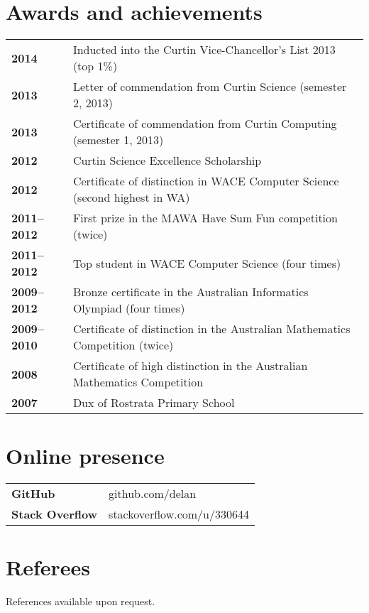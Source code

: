 \documentclass[a4paper,12pt]{article}
\begin{document}
\section*{Awards and achievements}

\begin{tabular}{p{4cm}p{14cm}}
	\textbf{2014} &
		Inducted into the Curtin Vice-Chancellor's List 2013
		(top 1\%) \\
	\textbf{2013} &
		Letter of commendation from Curtin Science
		(semester 2, 2013) \\
	\textbf{2013} &
		Certificate of commendation from Curtin Computing
		(semester 1, 2013) \\
	\textbf{2012} &
		Curtin Science Excellence Scholarship \\
	\textbf{2012} &
		Certificate of distinction in WACE Computer Science
		(second highest in WA) \\
	\textbf{2011--2012} &
		First prize in the MAWA Have Sum Fun competition (twice) \\
	\textbf{2011--2012} &
		Top student in WACE Computer Science (four times) \\
	\textbf{2009--2012} &
		Bronze certificate in the Australian Informatics Olympiad
		(four times) \\
	\textbf{2009--2010} &
		Certificate of distinction in the Australian Mathematics
		Competition (twice) \\
	\textbf{2008} &
		Certificate of high distinction in the Australian Mathematics
		Competition \\
	\textbf{2007} &
		Dux of Rostrata Primary School \\
\end{tabular}

\vspace{0.5cm}

\begin{minipage}[t]{9cm}
\section*{Online presence}
\begin{tabular}{ll}
	\textbf{GitHub} &
		github.com/delan \\
	\textbf{Stack Overflow} &
		stackoverflow.com/u/330644 \\
\end{tabular}
\end{minipage}\hfill\begin{minipage}[t]{9cm}
\section*{Referees}
References available upon request.
\end{minipage}
\end{document}
